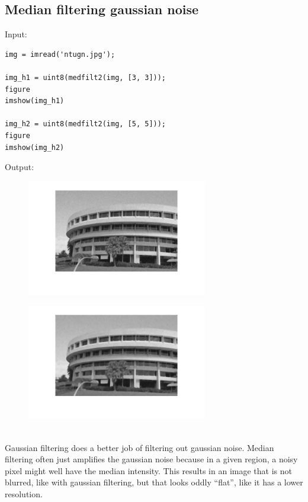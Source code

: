 \documentclass[12pt, a4paper]{article}
\begin{document}
\subsection{Median filtering gaussian noise}
Input:
\begin{verbatim}
img = imread('ntugn.jpg');

img_h1 = uint8(medfilt2(img, [3, 3]));
figure
imshow(img_h1)

img_h2 = uint8(medfilt2(img, [5, 5]));
figure
imshow(img_h2)
\end{verbatim}
Output:
\begin{figure}[H]
    \centering
    \includegraphics[width=0.7\textwidth]{fig17.png}
\end{figure}
\begin{figure}[H]
    \centering
    \includegraphics[width=0.7\textwidth]{fig18.png}
\end{figure}
~\\
Gaussian filtering does a better job of filtering out gaussian noise. Median filtering often just amplifies the gaussian noise because in a given region, a noisy pixel might well have the median intensity. This results in an image that is not blurred, like with gaussian filtering, but that looks oddly ``flat'', like it has a lower resolution.
\end{document}
